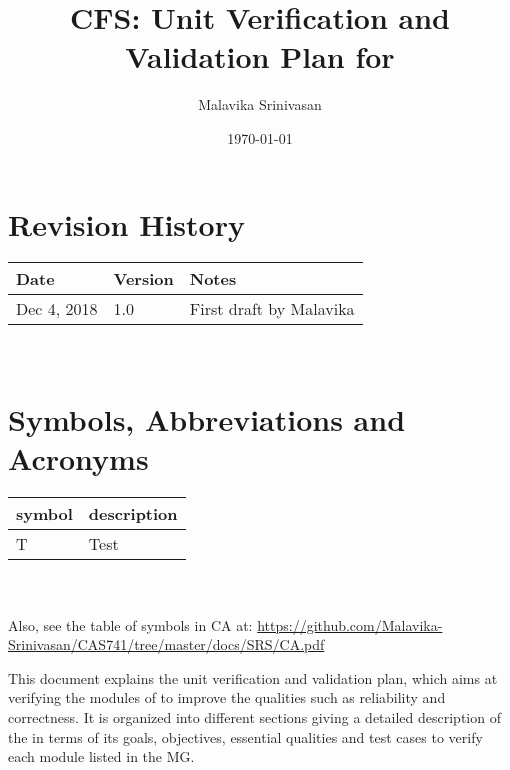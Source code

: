 \documentclass[12pt, titlepage]{article}
\begin{document}
\title{CFS: Unit Verification and Validation Plan for \famname{}} 
\author{Malavika Srinivasan}
\date{\today}
	
\maketitle


\section{Revision History}

\begin{tabularx}{\textwidth}{p{3cm}p{2cm}X}
\toprule {\bf Date} & {\bf Version} & {\bf Notes}\\
\midrule
Dec 4, 2018 & 1.0 & First draft by Malavika\\

\bottomrule
\end{tabularx}

~\newpage

\tableofcontents





\newpage

\section{Symbols, Abbreviations and Acronyms}

\renewcommand{\arraystretch}{1.2}
\begin{tabular}{l l} 
	\toprule		
	\textbf{symbol} & \textbf{description}\\
	\midrule 
	T & Test\\
	\bottomrule
\end{tabular}\\
\\



Also, see the table of symbols in CA at: 
\url{https://github.com/Malavika-Srinivasan/CAS741/tree/master/docs/SRS/CA.pdf}
\\


\newpage



This document explains the unit verification and validation plan, which aims at 
verifying the modules of \famname{} to improve the qualities such as 
reliability and correctness. It is organized into different 
sections giving a detailed description of the \famname{} in terms of its 
goals, objectives, essential qualities and test cases to verify each module 
listed in the MG. 
\end{document}
